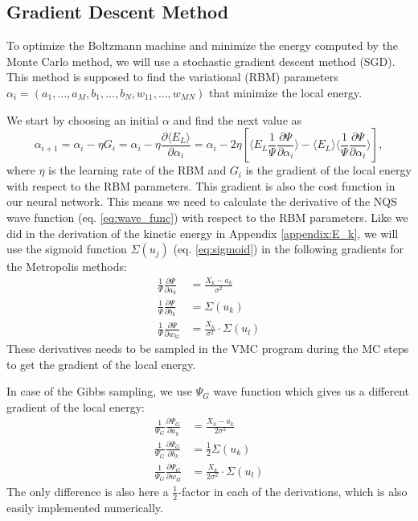 \documentclass[12pt,a4paper,english]{article}
\begin{document}
\subsection{Gradient Descent Method}
\label{subsect:Gradient}
To optimize the Boltzmann machine and minimize the energy computed by the Monte Carlo method, we will use a stochastic gradient descent method (SGD). This method is supposed to find the variational (RBM) parameters $\alpha_i=(a_1,...,a_M,b_1,...,b_N,w_{11},...,w_{MN})$ that minimize the local energy.

We start by choosing an initial $\alpha$ and find the next value as
\begin{equation}
\label{eq:grad_recursive}
\alpha_{i+1}=\alpha_i-\eta G_i=\alpha_i-\eta\frac{\partial \langle E_L\rangle}{\partial \alpha_i}=\alpha_i-2\eta\left[\langle E_L\frac{1}{\Psi}\frac{\partial \Psi}{\partial \alpha_i}\rangle-\langle E_L\rangle\langle\frac{1}{\Psi}\frac{\partial \Psi}{\partial \alpha_i}\rangle\right],
\end{equation}
where $\eta$ is the learning rate of the RBM and $G_i$ is the gradient of the local energy with respect to the RBM parameters. This gradient is also the cost function in our neural network. This means we need to calculate the derivative of the NQS wave function (eq. \ref{eq:wave_func}) with respect to the RBM parameters. Like we did in the derivation of the kinetic energy in Appendix \ref{appendix:E_k}, we will use the sigmoid function $\Sigma(u_j)$ (eq. \ref{eq:sigmoid}) in the following gradients for the Metropolis methods:
\begin{align*}
\frac{1}{\Psi}\frac{\partial \Psi}{\partial a_k}&=\frac{X_k-a_k}{\sigma^2}\\
\frac{1}{\Psi}\frac{\partial \Psi}{\partial b_k}&=\Sigma(u_k)\\
\frac{1}{\Psi}\frac{\partial \Psi}{\partial w_{kl}}&=\frac{X_k}{\sigma^2}\cdot\Sigma(u_l)
\end{align*}
These derivatives needs to be sampled in the VMC program during the MC steps to get the gradient of the local energy.

In case of the Gibbs sampling, we use $\Psi_G$ wave function which gives us a different gradient of the local energy:
\begin{align*}
\frac{1}{\Psi_G}\frac{\partial \Psi_G}{\partial a_k}&=\frac{X_k-a_k}{2\sigma^2}\\
\frac{1}{\Psi_G}\frac{\partial \Psi_G}{\partial b_k}&=\frac{1}{2}\Sigma(u_k)\\
\frac{1}{\Psi_G}\frac{\partial \Psi_G}{\partial w_{kl}}&=\frac{X_k}{2\sigma^2}\cdot\Sigma(u_l)
\end{align*}
The only difference is also here a $\frac{1}{2}$-factor in each of the derivations, which is also easily implemented numerically.
\end{document}
